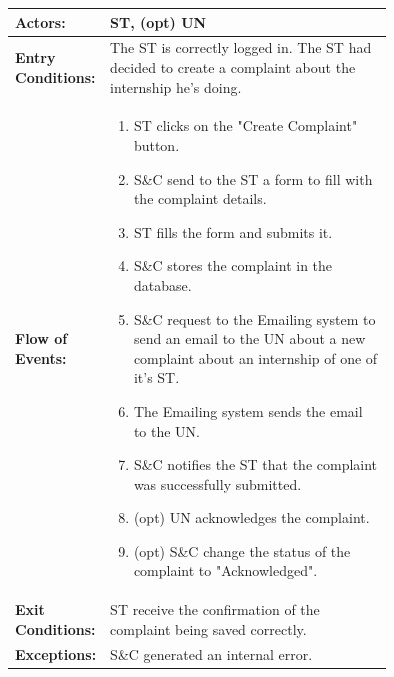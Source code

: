 \begin{center}
    \begin{longtable}{|l|p{0.75\linewidth}|}
        \hline
        \textbf{Actors:}           & ST, (opt) UN                                                                                                                     \\
        \hline
        \textbf{Entry Conditions:} & The ST is correctly logged in. The ST had decided to create a complaint about the internship he's doing.                         \\
        \hline
        \textbf{Flow of Events:}   & \begin{enumerate}
                                         \item ST clicks on the "Create Complaint" button.
                                         \item S\&C send to the ST a form to fill with the complaint details.
                                         \item ST fills the form and submits it.
                                         \item S\&C stores the complaint in the database.
                                         \item S\&C request to the Emailing system to send an email to the UN about a new complaint about an internship of one of it's ST.
                                         \item The Emailing system sends the email to the UN.
                                         \item S\&C notifies the ST that the complaint was successfully submitted.
                                         \item (opt) UN acknowledges the complaint.
                                         \item (opt) S\&C change the status of the complaint to "Acknowledged".
                                     \end{enumerate} \\
        \hline
        \textbf{Exit Conditions:}  & ST receive the confirmation of the complaint being saved correctly.                                                              \\
        \hline
        \textbf{Exceptions:}       & S\&C generated an internal error.                                                                                                \\
        \hline
    \end{longtable}
\end{center}

